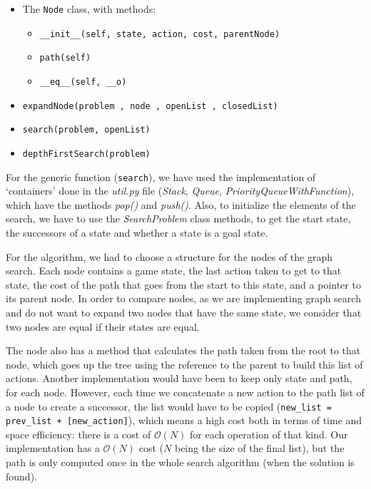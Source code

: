 \documentclass{article}
\begin{document}
\begin{itemize}
    \item The \texttt{Node} class, with methods:
    \begin{itemize}
        \item \texttt{\_\_init\_\_(self, state, action, cost, parentNode)}
        \item \texttt{path(self)}
        \item \texttt{\_\_eq\_\_(self, \_\_o)}
    \end{itemize}
    \item \texttt{expandNode(problem , node , openList , closedList)}
    \item \texttt{search(problem, openList)}
    \item \texttt{depthFirstSearch(problem)}
\end{itemize}

For the generic function (\texttt{search}), we have used the implementation of `containers' done in the \emph{util.py} file (\emph{Stack}, \emph{Queue}, \emph{PriorityQueueWithFunction}), which have the methods \emph{pop()} and \emph{push()}. Also, to initialize the elements of the search, we have to use the \emph{SearchProblem} class methods, to get the start state, the successors of a state and whether a state is a goal state.

For the algorithm, we had to choose a structure for the nodes of the graph search. Each node contains a game state, the last action taken to get to that state, the cost of the path that goes from the start to this state, and a pointer to its parent node. In order to compare nodes, as we are implementing graph search and do not want to expand two nodes that have the same state, we consider that two nodes are equal if their states are equal.

The node also has a method that calculates the path taken from the root to that node, which goes up the tree using the reference to the parent to build this list of actions. Another implementation would have been to keep only state and path, for each node. However, each time we concatenate a new action to the path list of a node to create a successor, the list would have to be copied (\texttt{new\_list = prev\_list + [new\_action]}), which means a high cost both in terms of time and space efficiency: there is a cost of $\mathcal{O}(N)$ for each operation of that kind. Our implementation has a $\mathcal{O}(N)$ cost ($N$ being the size of the final list), but the path is only computed once in the whole search algorithm (when the solution is found). 
\end{document}
